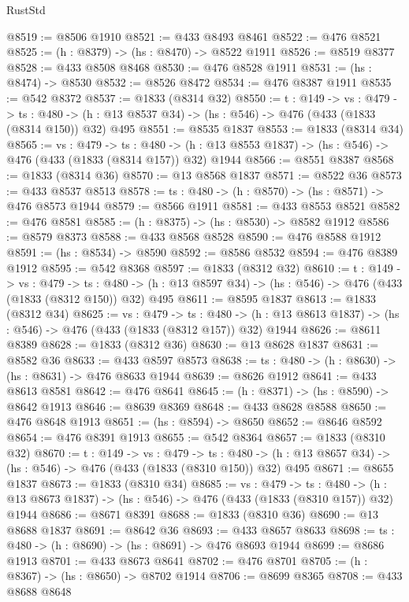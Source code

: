 \begin{lexlean}{RustStd}
\begin{coremodule}
@8519 := @8506 @1910
@8521 := @433 @8493 @8461
@8522 := @476 @8521
@8525 := (h : @8379) -> (hs : @8470) -> @8522 @1911
@8526 := @8519 @8377
@8528 := @433 @8508 @8468
@8530 := @476 @8528 @1911
@8531 := (hs : @8474) -> @8530
@8532 := @8526 @8472
@8534 := @476 @8387 @1911
@8535 := @542 @8372
@8537 := @1833 (@8314 @32)
@8550 := {t : @149} ->
  {vs : @479} ->
  {ts : @480} -> (h : @13 @8537 @34) -> (hs : @546) -> @476 (@433 (@1833 (@8314 @150)) @32) @495
@8551 := @8535 @1837
@8553 := @1833 (@8314 @34)
@8565 := {vs : @479} ->
  {ts : @480} -> (h : @13 @8553 @1837) -> (hs : @546) -> @476 (@433 (@1833 (@8314 @157)) @32) @1944
@8566 := @8551 @8387
@8568 := @1833 (@8314 @36)
@8570 := @13 @8568 @1837
@8571 := @8522 @36
@8573 := @433 @8537 @8513
@8578 := {ts : @480} -> (h : @8570) -> (hs : @8571) -> @476 @8573 @1944
@8579 := @8566 @1911
@8581 := @433 @8553 @8521
@8582 := @476 @8581
@8585 := (h : @8375) -> (hs : @8530) -> @8582 @1912
@8586 := @8579 @8373
@8588 := @433 @8568 @8528
@8590 := @476 @8588 @1912
@8591 := (hs : @8534) -> @8590
@8592 := @8586 @8532
@8594 := @476 @8389 @1912
@8595 := @542 @8368
@8597 := @1833 (@8312 @32)
@8610 := {t : @149} ->
  {vs : @479} ->
  {ts : @480} -> (h : @13 @8597 @34) -> (hs : @546) -> @476 (@433 (@1833 (@8312 @150)) @32) @495
@8611 := @8595 @1837
@8613 := @1833 (@8312 @34)
@8625 := {vs : @479} ->
  {ts : @480} -> (h : @13 @8613 @1837) -> (hs : @546) -> @476 (@433 (@1833 (@8312 @157)) @32) @1944
@8626 := @8611 @8389
@8628 := @1833 (@8312 @36)
@8630 := @13 @8628 @1837
@8631 := @8582 @36
@8633 := @433 @8597 @8573
@8638 := {ts : @480} -> (h : @8630) -> (hs : @8631) -> @476 @8633 @1944
@8639 := @8626 @1912
@8641 := @433 @8613 @8581
@8642 := @476 @8641
@8645 := (h : @8371) -> (hs : @8590) -> @8642 @1913
@8646 := @8639 @8369
@8648 := @433 @8628 @8588
@8650 := @476 @8648 @1913
@8651 := (hs : @8594) -> @8650
@8652 := @8646 @8592
@8654 := @476 @8391 @1913
@8655 := @542 @8364
@8657 := @1833 (@8310 @32)
@8670 := {t : @149} ->
  {vs : @479} ->
  {ts : @480} -> (h : @13 @8657 @34) -> (hs : @546) -> @476 (@433 (@1833 (@8310 @150)) @32) @495
@8671 := @8655 @1837
@8673 := @1833 (@8310 @34)
@8685 := {vs : @479} ->
  {ts : @480} -> (h : @13 @8673 @1837) -> (hs : @546) -> @476 (@433 (@1833 (@8310 @157)) @32) @1944
@8686 := @8671 @8391
@8688 := @1833 (@8310 @36)
@8690 := @13 @8688 @1837
@8691 := @8642 @36
@8693 := @433 @8657 @8633
@8698 := {ts : @480} -> (h : @8690) -> (hs : @8691) -> @476 @8693 @1944
@8699 := @8686 @1913
@8701 := @433 @8673 @8641
@8702 := @476 @8701
@8705 := (h : @8367) -> (hs : @8650) -> @8702 @1914
@8706 := @8699 @8365
@8708 := @433 @8688 @8648

\end{coremodule}
\end{lexlean}
